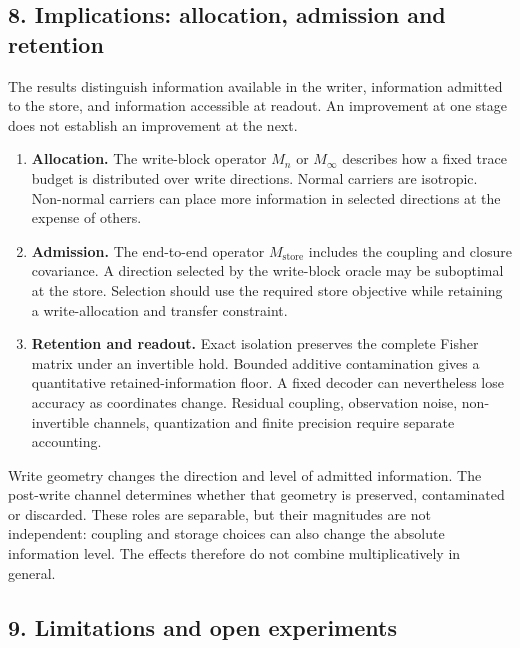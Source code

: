 \documentclass[
  10pt,
]{article}
\begin{document}
\subsection{8. Implications: allocation, admission and
retention}\label{implications-allocation-admission-and-retention}

The results distinguish information available in the writer, information
admitted to the store, and information accessible at readout. An
improvement at one stage does not establish an improvement at the next.

\begin{enumerate}
\def\labelenumi{\arabic{enumi}.}
\item
  \textbf{Allocation.} The write-block operator \(M_n\) or \(M_\infty\)
  describes how a fixed trace budget is distributed over write
  directions. Normal carriers are isotropic. Non-normal carriers can
  place more information in selected directions at the expense of
  others.
\item
  \textbf{Admission.} The end-to-end operator \(M_{\mathrm{store}}\)
  includes the coupling and closure covariance. A direction selected by
  the write-block oracle may be suboptimal at the store. Selection
  should use the required store objective while retaining a
  write-allocation and transfer constraint.
\item
  \textbf{Retention and readout.} Exact isolation preserves the complete
  Fisher matrix under an invertible hold. Bounded additive contamination
  gives a quantitative retained-information floor. A fixed decoder can
  nevertheless lose accuracy as coordinates change. Residual coupling,
  observation noise, non-invertible channels, quantization and finite
  precision require separate accounting.
\end{enumerate}

Write geometry changes the direction and level of admitted information.
The post-write channel determines whether that geometry is preserved,
contaminated or discarded. These roles are separable, but their
magnitudes are not independent: coupling and storage choices can also
change the absolute information level. The effects therefore do not
combine multiplicatively in general.

\subsection{9. Limitations and open
experiments}\label{limitations-and-open-experiments}
\end{document}
